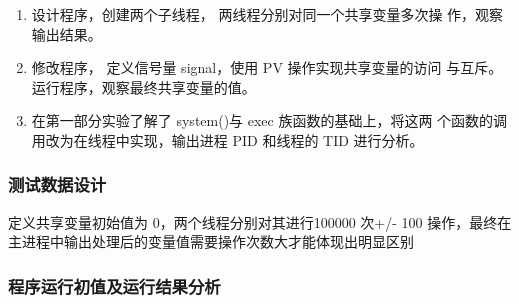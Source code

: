 \documentclass{article}
\begin{document}
    \begin{enumerate}
        \item 设计程序，创建两个子线程， 两线程分别对同一个共享变量多次操
        作，观察输出结果。
        \item 修改程序， 定义信号量 signal，使用 PV 操作实现共享变量的访问
        与互斥。运行程序，观察最终共享变量的值。
        \item 在第一部分实验了解了 system()与 exec 族函数的基础上，将这两
        个函数的调用改为在线程中实现，输出进程 PID 和线程的 TID 进行分析。
    \end{enumerate}

    \subsubsection{测试数据设计}

    定义共享变量初始值为 0，两个线程分别对其进行100000 次+/- 100 操作，最终在主进程中输出处理后的变量值需要操作次数大才能体现出明显区别

    \subsubsection{程序运行初值及运行结果分析}
\end{document}
